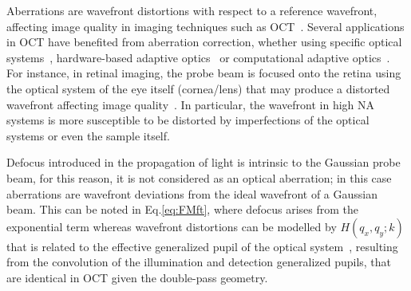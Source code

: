 Aberrations are wavefront distortions with respect to a reference wavefront, affecting image quality in imaging techniques such as OCT~\cite{Pircher2017_Review}. Several applications in OCT have benefited from aberration correction, whether using specific optical systems~\cite{Meemon2008_Optical, Xi2009_Highresolution,Mo2013_FocusExtension, Bo2017_Depthoffocus}, hardware-based adaptive optics~\cite{Zawadzki2005_Adaptiveoptics, Zhang2006_Highspeed} or computational adaptive optics~\cite{Kumar2017_Invivo, Hillmann2016_Aberrationfree, Fechtig2014_Line, Wu2019_Computed}. For instance, in retinal imaging, the probe beam is focused onto the retina using the optical system of the eye itself (cornea/lens) that may produce a distorted wavefront affecting image quality~\cite{Liang1997_Aberrations}. In particular, the wavefront in high NA systems is more susceptible to be distorted by imperfections of the optical systems or even the sample itself.

Defocus introduced in the propagation of light is intrinsic to the Gaussian probe beam, for this reason, it is not considered as an optical aberration; in this case aberrations are wavefront deviations from the ideal wavefront of a Gaussian beam. This can be noted in Eq.\eqref{eq:FMft}, where defocus arises from the exponential term whereas wavefront distortions can be modelled by $H(q_x, q_y; k)$ that is related to the effective generalized pupil of the optical system~\cite{Liu2017_Computational}, resulting from the convolution of the illumination and detection generalized pupils, that are identical in OCT given the double-pass geometry.

